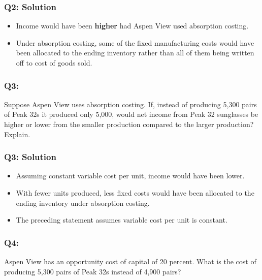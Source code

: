 \hypertarget{q2-solution}{%
\subsubsection{Q2: Solution}\label{q2-solution}}

\begin{itemize}
\tightlist
\item
  Income would have been \textbf{higher} had Aspen View used absorption
  costing.
\item
  Under absorption costing, some of the fixed manufacturing costs would
  have been allocated to the ending inventory rather than all of them
  being written off to cost of goods sold.
\end{itemize}

\hypertarget{q3}{%
\subsubsection{Q3:}\label{q3}}

Suppose Aspen View uses absorption costing. If, instead of producing
5,300 pairs of Peak 32s it produced only 5,000, would net income from
Peak 32 sunglasses be higher or lower from the smaller production
compared to the larger production? Explain.

\hypertarget{q3-solution}{%
\subsubsection{Q3: Solution}\label{q3-solution}}

\begin{itemize}
\tightlist
\item
  Assuming constant variable cost per unit, income would have been
  lower.
\item
  With fewer units produced, less fixed costs would have been allocated
  to the ending inventory under absorption costing.
\item
  The preceding statement assumes variable cost per unit is constant.
\end{itemize}

\hypertarget{q4}{%
\subsubsection{Q4:}\label{q4}}

Aspen View has an opportunity cost of capital of 20 percent. What is the
cost of producing 5,300 pairs of Peak 32s instead of 4,900 pairs?

